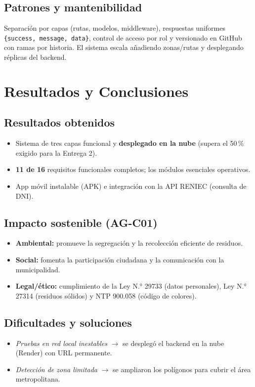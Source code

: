 \documentclass[11pt,a4paper]{article}
\begin{document}
\subsection{Patrones y mantenibilidad}
Separación por capas (rutas, modelos, middleware), respuestas uniformes \texttt{\{success, message, data\}}, control de acceso por rol y versionado en GitHub con ramas por historia. El sistema escala añadiendo zonas/rutas y desplegando réplicas del backend.

\newpage
\section{Resultados y Conclusiones}
\subsection{Resultados obtenidos}
\begin{itemize}[leftmargin=*]
    \item Sistema de tres capas funcional y \textbf{desplegado en la nube} (supera el 50\,\% exigido para la Entrega 2).
    \item \textbf{11 de 16} requisitos funcionales completos; los módulos esenciales operativos.
    \item App móvil instalable (APK) e integración con la API RENIEC (consulta de DNI).
\end{itemize}

\subsection{Impacto sostenible (AG-C01)}
\begin{itemize}[leftmargin=*]
    \item \textbf{Ambiental:} promueve la segregación y la recolección eficiente de residuos.
    \item \textbf{Social:} fomenta la participación ciudadana y la comunicación con la municipalidad.
    \item \textbf{Legal/ético:} cumplimiento de la Ley N.° 29733 (datos personales), Ley N.° 27314 (residuos sólidos) y NTP 900.058 (código de colores).
\end{itemize}

\subsection{Dificultades y soluciones}
\begin{itemize}[leftmargin=*]
    \item \textit{Pruebas en red local inestables} $\rightarrow$ se desplegó el backend en la nube (Render) con URL permanente.
    \item \textit{Detección de zona limitada} $\rightarrow$ se ampliaron los polígonos para cubrir el área metropolitana.
\end{itemize}
\end{document}

